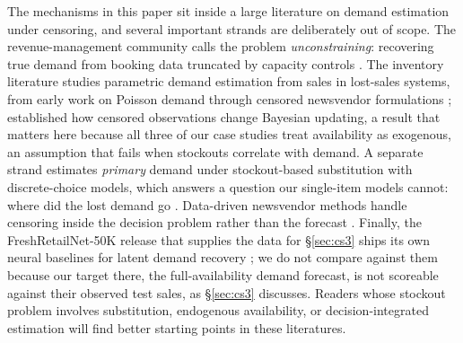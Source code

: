 The mechanisms in this paper sit inside a large literature on demand estimation under censoring, and several important strands are deliberately out of scope. The revenue-management community calls the problem \emph{unconstraining}: recovering true demand from booking data truncated by capacity controls \citep{talluri2004theory, weatherford2002better, queenan2007comparison}. The inventory literature studies parametric demand estimation from sales in lost-sales systems, from early work on Poisson demand through censored newsvendor formulations \citep{conrad1976sales, nahmias1994demand, agrawal1996estimating, ding2002censored}; \citet{braden1991informational} established how censored observations change Bayesian updating, a result that matters here because all three of our case studies treat availability as exogenous, an assumption that fails when stockouts correlate with demand. A separate strand estimates \emph{primary} demand under stockout-based substitution with discrete-choice models, which answers a question our single-item models cannot: where did the lost demand go \citep{anupindi1998estimation, kok2007demand, musalem2010structural, vulcano2012estimating}. Data-driven newsvendor methods handle censoring inside the decision problem rather than the forecast \citep{sachs2014data, huber2019data}. Finally, the FreshRetailNet-50K release that supplies the data for \S\ref{sec:cs3} ships its own neural baselines for latent demand recovery \citep{wang2025freshretailnet}; we do not compare against them because our target there, the full-availability demand forecast, is not scoreable against their observed test sales, as \S\ref{sec:cs3} discusses. Readers whose stockout problem involves substitution, endogenous availability, or decision-integrated estimation will find better starting points in these literatures.
